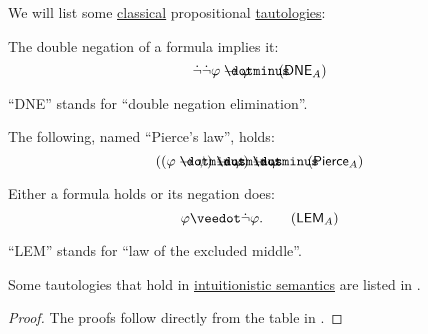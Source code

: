 \begin{proposition}\label{thm:classical_tautologies}
  We will list some \hyperref[def:propositional_semantics]{classical} propositional \hyperref[def:propositional_tautology]{tautologies}:
  \begin{thmenum}
     The double negation of a formula implies it:
    \begin{equation}\label{eq:thm:classical_tautologies/dne}
      \synneg \synneg \varphi \synimplies \varphi \tag{\( \logic{DNE}_A \)}
    \end{equation}

    \enquote{DNE} stands for \enquote{double negation elimination}.

     The following, named \enquote{Pierce's law}, holds:
    \begin{equation}\label{eq:thm:classical_tautologies/pierce}
      ((\varphi \synimplies \psi) \synimplies \varphi) \synimplies \varphi \tag{\( \logic{Pierce}_A \)}
    \end{equation}

     Either a formula holds or its negation does:
    \begin{equation}\label{eq:thm:classical_tautologies/lem}
      \varphi \synvee \synneg \varphi. \tag{\( \logic{LEM}_A \)}
    \end{equation}

    \enquote{LEM} stands for \enquote{law of the excluded middle}.
  \end{thmenum}
\end{proposition}
\begin{comments}
  \item Some tautologies that hold in \hyperref[def:propositional_semantics]{intuitionistic semantics} are listed in .
\end{comments}
\begin{proof}
  The proofs follow directly from the table in .
\end{proof}

